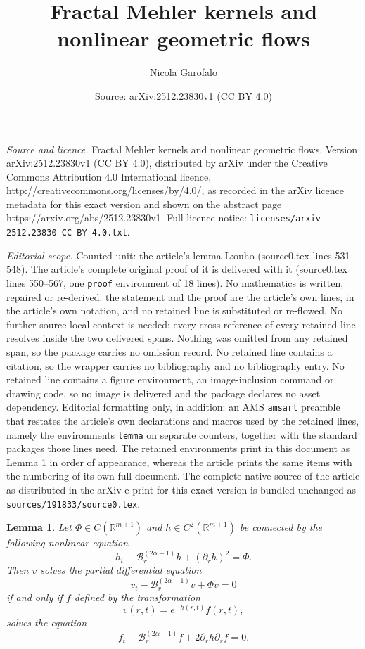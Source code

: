 \documentclass[10pt,a4paper]{amsart}
\title{Fractal Mehler kernels and nonlinear geometric flows}
\author{Nicola Garofalo}
\date{Source: arXiv:2512.23830v1 (CC BY 4.0)}
\newtheorem{lemma}{Lemma}
\newcommand{\Barr}{\mathscr B_r^{(2\alpha-1)}}
\def \R {\mathbb{R}}
\newcommand{\p}{\partial}
\begin{document}
\maketitle

\noindent\emph{Source and licence.} Fractal Mehler kernels and nonlinear geometric flows. Version arXiv:2512.23830v1 (CC BY 4.0), distributed by arXiv under the Creative Commons Attribution 4.0 International licence, http://creativecommons.org/licenses/by/4.0/, as recorded in the arXiv licence metadata for this exact version and shown on the abstract page https://arxiv.org/abs/2512.23830v1. Full licence notice: \texttt{licenses/arxiv-2512.23830-CC-BY-4.0.txt}.\par\smallskip

\noindent\textit{Editorial scope.} Counted unit: the article's lemma L:ouho (source0.tex lines 531--548). The article's complete original proof of it is delivered with it (source0.tex lines 550--567, one \texttt{proof} environment of 18 lines). No mathematics is written, repaired or re-derived: the statement and the proof are the article's own lines, in the article's own notation, and no retained line is substituted or re-flowed.  No further source-local context is needed: every cross-reference of every retained line resolves inside the two delivered spans.  Nothing was omitted from any retained span, so the package carries no omission record.  No retained line contains a citation, so the wrapper carries no bibliography and no bibliography entry.  No retained line contains a figure environment, an image-inclusion command or drawing code, so no image is delivered and the package declares no asset dependency.  Editorial formatting only, in addition: an AMS \texttt{amsart} preamble that restates the article's own declarations and macros used by the retained lines, namely the environments \texttt{lemma} on separate counters, together with the standard packages those lines need.  The retained environments print in this document as Lemma 1 in order of appearance, whereas the article prints the same items with the numbering of its own full document.  The complete native source of the article as distributed in the arXiv e-print for this exact version is bundled unchanged as \texttt{sources/191833/source0.tex}.
\begin{lemma}\label{L:ouho}
Let $\Phi\in C(\R^{m+1})$ and $h\in C^2(\R^{m+1})$ be connected by the following  nonlinear equation
\begin{equation}\label{riccati}
h_t - \Barr h + (\p_r h)^2  = \Phi.
\end{equation}
Then $v$ solves the partial differential equation
\begin{equation}\label{pdeho}
v_t -\Barr v + \Phi v  = 0
\end{equation}
if and only if $f$ defined by the transformation
\begin{equation}\label{genexp}
v(r,t) = e^{-h(r,t)} f(r,t),
\end{equation} 
solves the equation
\begin{equation}\label{PDEou}
f_t - \Barr f + 2 \p_r h \p_r  f  = 0.
\end{equation}
\end{lemma}
\end{document}
